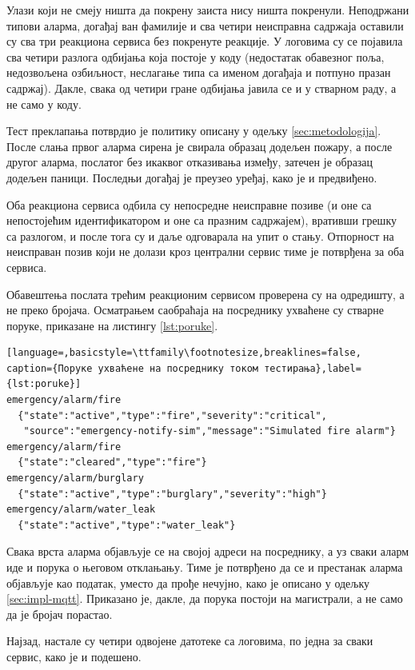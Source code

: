 \documentclass[12pt,oneside]{memoir}
\begin{document}
Улази који не смеју ништа да покрену заиста нису ништа покренули. Неподржани типови аларма,
догађај ван фамилије  и сва четири неисправна садржаја оставили су сва три
реакциона сервиса без покренуте реакције. У логовима су се појавила сва четири разлога
одбијања која постоје у коду (недостатак обавезног поља, недозвољена озбиљност, неслагање
типа са именом догађаја и потпуно празан садржај). Дакле, свака од четири гране одбијања јавила се
и у стварном раду, а не само у коду.

Тест преклапања потврдио је политику описану у одељку \ref{sec:metodologija}. После слања
првог аларма сирена је свирала образац додељен пожару, а после другог аларма, послатог без
икаквог отказивања између, затечен је образац додељен паници. Последњи догађај је преузео
уређај, како је и предвиђено.

Оба реакциона сервиса одбила су непосредне неисправне позиве (и оне са непостојећим
идентификатором и оне са празним садржајем), вративши грешку са разлогом, и после тога су
и даље одговарала на упит о стању. Отпорност на неисправан позив који не долази кроз
централни сервис тиме је потврђена за оба сервиса.

Обавештења послата трећим реакционим сервисом проверена су на одредишту, а не преко бројача.
Осматрањем саобраћаја на посреднику ухваћене су стварне поруке, приказане на листингу
\ref{lst:poruke}.

\begin{lstlisting}[language=,basicstyle=\ttfamily\footnotesize,breaklines=false,
caption={Поруке ухваћене на посреднику током тестирања},label={lst:poruke}]
emergency/alarm/fire
  {"state":"active","type":"fire","severity":"critical",
   "source":"emergency-notify-sim","message":"Simulated fire alarm"}
emergency/alarm/fire
  {"state":"cleared","type":"fire"}
emergency/alarm/burglary
  {"state":"active","type":"burglary","severity":"high"}
emergency/alarm/water_leak
  {"state":"active","type":"water_leak"}
\end{lstlisting}

Свака врста аларма објављује се на својој адреси на посреднику, а уз сваки аларм иде и порука о његовом
отклањању. Тиме је потврђено да се и престанак аларма објављује као податак, уместо да прође нечујно, 
како је описано у одељку \ref{sec:impl-mqtt}. Приказано је, дакле, да порука постоји на
магистрали, а не само да је бројач порастао.

Најзад, настале су четири одвојене датотеке са логовима, по једна за сваки сервис, како је и
подешено.
\end{document}
